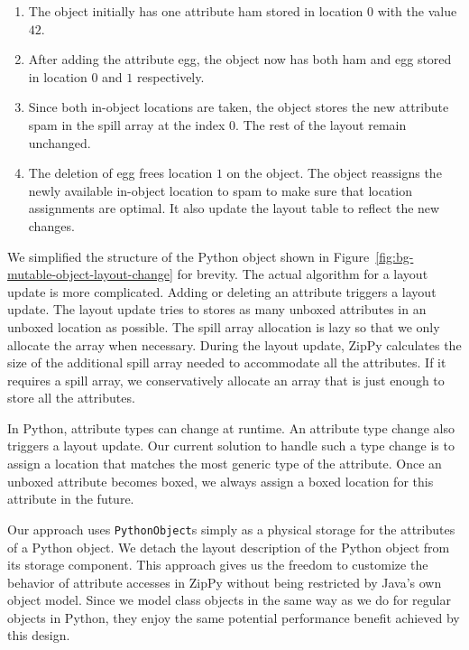 \begin{enumerate}

\item The object initially has one attribute \textsf{ham} stored in location $0$ with the value $42$.

\item After adding the attribute \textsf{egg}, the object now has both \textsf{ham} and \textsf{egg} stored in location $0$ and $1$ respectively.

\item Since both in-object locations are taken, the object stores the new attribute \textsf{spam} in the spill array at the index $0$.
The rest of the layout remain unchanged.

\item The deletion of \textsf{egg} frees location $1$ on the object.
The object reassigns the newly available in-object location to \textsf{spam} to make sure that location assignments are optimal.
It also update the layout table to reflect the new changes.

\end{enumerate}

We simplified the structure of the Python object shown in Figure~\ref{fig:bg-mutable-object-layout-change} for brevity.
The actual algorithm for a layout update is more complicated.
Adding or deleting an attribute triggers a layout update.
The layout update tries to stores as many unboxed attributes in an unboxed location as possible.
The spill array allocation is lazy so that we only allocate the array when necessary.
During the layout update, ZipPy calculates the size of the additional spill array needed to accommodate all the attributes.
If it requires a spill array, we conservatively allocate an array that is just enough to store all the attributes.

In Python, attribute types can change at runtime.
An attribute type change also triggers a layout update.
Our current solution to handle such a type change is to assign a location that matches the most generic type of the attribute.
Once an unboxed attribute becomes boxed, we always assign a boxed location for this attribute in the future.

Our approach uses \texttt{PythonObject}s simply as a physical storage for the attributes of a Python object.
We detach the layout description of the Python object from its storage component.
This approach gives us the freedom to customize the behavior of attribute accesses in ZipPy without being restricted by Java's own object model.
Since we model class objects in the same way as we do for regular objects in Python, they enjoy the same potential performance benefit achieved by this design.

